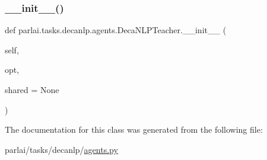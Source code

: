 \subsubsection{\texorpdfstring{\+\_\+\+\_\+init\+\_\+\+\_\+()}{\_\_init\_\_()}}
{\footnotesize\ttfamily def parlai.\+tasks.\+decanlp.\+agents.\+Deca\+N\+L\+P\+Teacher.\+\_\+\+\_\+init\+\_\+\+\_\+ (\begin{DoxyParamCaption}\item[{}]{self,  }\item[{}]{opt,  }\item[{}]{shared = {\ttfamily None} }\end{DoxyParamCaption})}



The documentation for this class was generated from the following file\+:\begin{DoxyCompactItemize}
\item 
parlai/tasks/decanlp/\hyperlink{parlai_2tasks_2decanlp_2agents_8py}{agents.\+py}\end{DoxyCompactItemize}
